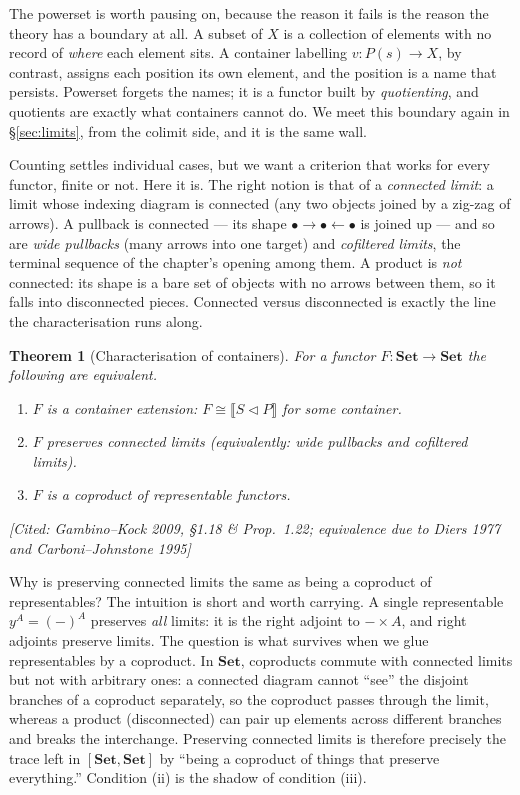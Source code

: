 \documentclass[11pt,a4paper]{book}
\newcommand{\Set}{\mathbf{Set}}
\newcommand{\y}{y}
\newcommand{\cont}[2]{#1 \triangleleft #2}
\newcommand{\Ext}[1]{\llbracket #1 \rrbracket}
\theoremstyle{plain}
\newtheorem{Theorem}{Theorem}[chapter]
\theoremstyle{definition}
\theoremstyle{remark}
\newcommand{\prov}[1]{\hfill\textsf{\footnotesize[#1]}}
\begin{document}
The powerset is worth pausing on, because the reason it fails is the reason the
theory has a boundary at all. A subset of $X$ is a collection of elements with no
record of \emph{where} each element sits. A container labelling $v\colon P(s)\to X$,
by contrast, assigns each position its own element, and the position is a name that
persists. Powerset forgets the names; it is a functor built by \emph{quotienting},
and quotients are exactly what containers cannot do. We meet this boundary again in
\S\ref{sec:limits}, from the colimit side, and it is the same wall.

Counting settles individual cases, but we want a criterion that works for every
functor, finite or not. Here it is. The right notion is that of a \emph{connected
limit}: a limit whose indexing diagram is connected (any two objects joined by a
zig-zag of arrows). A pullback is connected --- its shape
$\bullet\to\bullet\leftarrow\bullet$ is joined up --- and so are \emph{wide
pullbacks} (many arrows into one target) and \emph{cofiltered limits}, the terminal
sequence of the chapter's opening among them. A product is \emph{not} connected: its
shape is a bare set of objects with no arrows between them, so it falls into
disconnected pieces. Connected versus disconnected is exactly the line the
characterisation runs along.

\begin{Theorem}[Characterisation of containers]\label{thm:char}
For a functor $F\colon\Set\to\Set$ the following are equivalent.
\begin{enumerate}[label=\textup{(\roman*)},nosep]
\item $F$ is a container extension: $F\cong\Ext{\cont SP}$ for some container.
\item $F$ preserves connected limits (equivalently: wide pullbacks and cofiltered
      limits).
\item $F$ is a coproduct of representable functors.
\end{enumerate}
\prov{Cited: Gambino--Kock 2009, \S1.18 \& Prop.~1.22; equivalence due to Diers
1977 and Carboni--Johnstone 1995}
\end{Theorem}

Why is preserving connected limits the same as being a coproduct of representables?
The intuition is short and worth carrying. A single representable $\y^A=(-)^A$
preserves \emph{all} limits: it is the right adjoint to $-\times A$, and right
adjoints preserve limits. The question is what survives when we glue representables
by a coproduct. In $\Set$, coproducts commute with connected limits but not with
arbitrary ones: a connected diagram cannot ``see'' the disjoint branches of a
coproduct separately, so the coproduct passes through the limit, whereas a product
(disconnected) can pair up elements across different branches and breaks the
interchange. Preserving connected limits is therefore precisely the trace left in
$[\Set,\Set]$ by ``being a coproduct of things that preserve everything.'' Condition
(ii) is the shadow of condition (iii).
\end{document}
